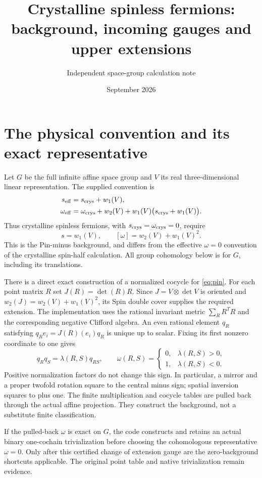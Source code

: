 \documentclass[11pt]{article}
\title{Crystalline spinless fermions:\\background, incoming gauges and upper extensions}
\author{Independent space-group calculation note}
\date{September 2026}
\begin{document}
\maketitle

\section{The physical convention and its exact representative}
Let $G$ be the full infinite affine space group and $V$ its real
three-dimensional linear representation. The supplied convention is
\begin{align}
 s_{\rm eff}&=s_{\rm crys}+w_1(V),\\
 \omega_{\rm eff}&=\omega_{\rm crys}+w_2(V)
       +w_1(V)\bigl(s_{\rm crys}+w_1(V)\bigr).
\end{align}
Thus crystalline spinless fermions, with
$s_{\rm crys}=\omega_{\rm crys}=0$, require
\begin{equation}\label{eq:pin}
 s=w_1(V),\qquad [\omega]=w_2(V)+w_1(V)^2.
\end{equation}
This is the Pin-minus background, and differs from the effective
$\omega=0$ convention of the crystalline spin-half calculation.
All group cohomology below is for $G$, including its translations.

There is a direct exact construction of a normalized cocycle for
\eqref{eq:pin}. For each point matrix $R$ set $J(R)=\det(R)R$. Since
$J=V\otimes\det V$ is oriented and
$w_2(J)=w_2(V)+w_1(V)^2$, its Spin double cover supplies the required
extension. The implementation uses the rational invariant metric
$\sum_R R^T R$ and the corresponding negative Clifford algebra.
An even rational element $q_R$ satisfying
$q_R e_i=J(R)(e_i)q_R$ is unique up to scalar. Fixing its first nonzero
coordinate to one gives
\begin{equation}
 q_Rq_S=\lambda(R,S)q_{RS},\qquad
 \omega(R,S)=\begin{cases}0,&\lambda(R,S)>0,\\1,&\lambda(R,S)<0.\end{cases}
\end{equation}
Positive normalization factors do not change this sign. In particular,
a mirror and a proper twofold rotation square to the central minus sign;
spatial inversion squares to plus one. The finite multiplication and
cocycle tables are pulled back through the actual affine projection.
They construct the background, not a substitute finite classification.

If the pulled-back $\omega$ is exact on $G$, the code constructs and
retains an actual binary one-cochain trivialization before choosing the
cohomologous representative $\omega=0$. Only after this certified change
of extension gauge are the zero-background shortcuts applicable.
The original point table and native trivialization remain evidence.
\end{document}
